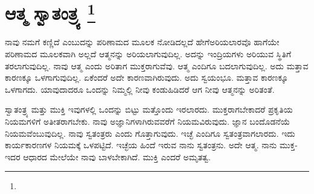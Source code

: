 
\vspace{-0.6cm}

\chapter[ಆತ್ಮ ಸ್ವಾತಂತ್ರ್ಯ ]{ಆತ್ಮ ಸ್ವಾತಂತ್ರ್ಯ \protect\footnote{}}

ನಾವು ನಮಗೆ ಕಣ್ಣಿದೆ ಎಂಬುದನ್ನು ಪರಿಣಾಮದ ಮೂಲಕ ನೋಡಿದಲ್ಲದೆ ಹೇಗೆ\break ಅರಿಯಲಾರವೊ ಹಾಗೆಯೇ ಪರಿಣಾಮದ ಮೂಲಕವಾಗಿ ಅಲ್ಲದೆ ಆತ್ಮನನ್ನು ಅರಿಯಲಾಗುವುದಿಲ್ಲ. ಅದನ್ನು ಇಂದ್ರಿಯಗಳು ಅರಿಯುವ ಸ್ಥಿತಿಗೆ ತರಲಾಗುವುದಿಲ್ಲ. ನಾವು ಆತ್ಮ ಎಂದು ಅರಿತಾಗ ಮುಕ್ತರಾಗುವೆವು. ಆತ್ಮ ಎಂದಿಗೂ ಬದಲಾಗುವುದಿಲ್ಲ. ಅದು ಮತ್ತಾವ ಕಾರಣಕ್ಕೂ ಒಳಗಾಗುವುದಿಲ್ಲ. ಏಕೆಂದರೆ ಅದೇ ಕಾರಣವಾಗಿರುವುದು. ಅದು ಸ್ವಯಂಭೂ. ಮತ್ತಾವ ಕಾರಣಕ್ಕೂ ಒಳಗಾಗದು. ಯಾವುದಾದರೂ ಒಂದನ್ನು ನಿಮ್ಮಲ್ಲಿ ನೀವು ಕಂಡು\break ಹಿಡಿದರೆ ಆಗ ನೀವು ಆತ್ಮನನ್ನು ಅರಿತಂತೆ.

ಸ್ವಾತಂತ್ರ್ಯ ಮತ್ತು ಮುಕ್ತಿ ಇವುಗಳಲ್ಲಿ ಒಂದನ್ನು ಬಿಟ್ಟು ಮತ್ತೊಂದು ಇರಲಾರದು. ಮುಕ್ತರಾಗಬೇಕಾದರೆ ಪ್ರಕೃತಿಯ ನಿಯಮಗಳಿಗೆ ಅತೀತರಾಗಬೇಕು. ನಾವು ಅಜ್ಞಾನಿಗಳಾಗಿರುವವರೆಗೆ ನಿಯಮವಿರುವುದು. ಜ್ಞಾನ ಬಂದೊಡನೆಯೆ ನಿಯಮವೆಂಬುವುದಿಲ್ಲ. ನಾವು ಸ್ವತಂತ್ರರು ಎಂದು ಗೊತ್ತಾಗುವುದು. ಇಚ್ಛೆ ಎಂದಿಗೂ ಸ್ವತಂತ್ರವಾಗಲಾರದು. ಇದು ಕಾರ್ಯಕಾರಣಗಳ ನಿಯಮಕ್ಕೆ ಒಳಪಟ್ಟಿದೆ. ಇಚ್ಛೆಯ ಹಿಂದೆ ಇರುವ ನಾನು ಸ್ವತಂತ್ರನು. ಅದೇ ಆತ್ಮ. ನಾನು ಮುಕ್ತ-ಇದರ ಆಧಾರದ ಮೇಲೆಯೇ ನಾವು ಬಾಳಬೇಕಾಗಿದೆ. ಮುಕ್ತಿ ಎಂದರೆ ಅಮೃತತ್ವ.


